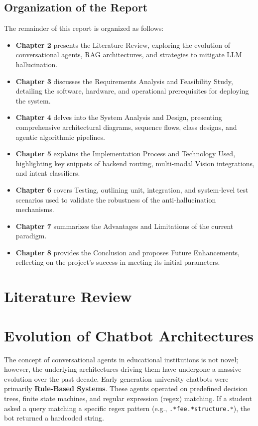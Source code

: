 \documentclass[12pt,a4paper]{report}
\begin{document}
\subsection*{Organization of the Report}
The remainder of this report is organized as follows:
\begin{itemize}
    \item \textbf{Chapter 2} presents the Literature Review, exploring the evolution of conversational agents, RAG architectures, and strategies to mitigate LLM hallucination.
    \item \textbf{Chapter 3} discusses the Requirements Analysis and Feasibility Study, detailing the software, hardware, and operational prerequisites for deploying the system.
    \item \textbf{Chapter 4} delves into the System Analysis and Design, presenting comprehensive architectural diagrams, sequence flows, class designs, and agentic algorithmic pipelines.
    \item \textbf{Chapter 5} explains the Implementation Process and Technology Used, highlighting key snippets of backend routing, multi-modal Vision integrations, and intent classifiers.
    \item \textbf{Chapter 6} covers Testing, outlining unit, integration, and system-level test scenarios used to validate the robustness of the anti-hallucination mechanisms.
    \item \textbf{Chapter 7} summarizes the Advantages and Limitations of the current paradigm.
    \item \textbf{Chapter 8} provides the Conclusion and proposes Future Enhancements, reflecting on the project's success in meeting its initial parameters.
\end{itemize}

\section{Literature Review}

\section{Evolution of Chatbot Architectures}
The concept of conversational agents in educational institutions is not novel; however, the underlying architectures driving them have undergone a massive evolution over the past decade. Early generation university chatbots were primarily \textbf{Rule-Based Systems}. These agents operated on predefined decision trees, finite state machines, and regular expression (regex) matching. If a student asked a query matching a specific regex pattern (e.g., \texttt{.*fee.*structure.*}), the bot returned a hardcoded string. 
\end{document}
